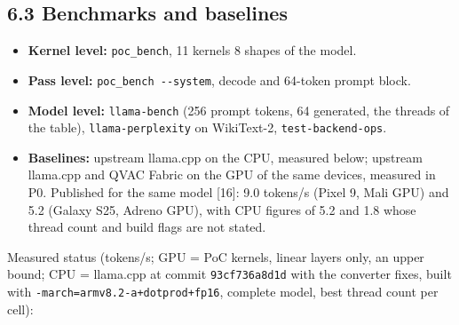 \documentclass[
  10pt,
]{article}
\providecommand{\tightlist}{%
  \setlength{\itemsep}{0pt}\setlength{\parskip}{0pt}}
\begin{document}
\subsection{6.3 Benchmarks and
baselines}\label{benchmarks-and-baselines}

\begin{itemize}
\tightlist%
\item
  \textbf{Kernel level:} \texttt{poc\_bench}, 11 kernels \texttimes{} 8 shapes of
  the model.
\item
  \textbf{Pass level:} \texttt{poc\_bench\ -{}-system}, decode and
  64-token prompt block.
\item
  \textbf{Model level:} \texttt{llama-bench} (256 prompt tokens, 64
  generated, the threads of the table), \texttt{llama-perplexity} on
  WikiText-2, \texttt{test-backend-ops}.
\item
  \textbf{Baselines:} upstream llama.cpp on the CPU, measured below;
  upstream llama.cpp and QVAC Fabric on the GPU of the same devices,
  measured in P0. Published for the same model [16]: 9.0 tokens/s
  (Pixel 9, Mali GPU) and 5.2 (Galaxy S25, Adreno GPU), with CPU figures
  of 5.2 and 1.8 whose thread count and build flags are not stated.
\end{itemize}

Measured status (tokens/s; GPU = PoC kernels, linear layers only, an
upper bound; CPU = llama.cpp at commit \texttt{93cf736a8d1d} with the
converter fixes, built with \texttt{-march=armv8.2-a+dotprod+fp16},
complete model, best thread count per cell):
\end{document}
